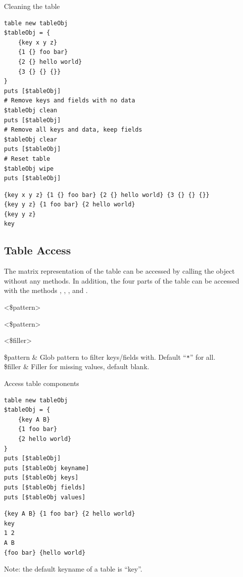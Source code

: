 \begin{example}{Cleaning the table}
\begin{lstlisting}
table new tableObj
$tableObj = {
    {key x y z}
    {1 {} foo bar}
    {2 {} hello world}
    {3 {} {} {}}
}
puts [$tableObj]
# Remove keys and fields with no data
$tableObj clean
puts [$tableObj]
# Remove all keys and data, keep fields
$tableObj clear
puts [$tableObj]
# Reset table 
$tableObj wipe
puts [$tableObj]
\end{lstlisting}
\tcblower
\begin{lstlisting}
{key x y z} {1 {} foo bar} {2 {} hello world} {3 {} {} {}}
{key y z} {1 foo bar} {2 hello world}
{key y z}
key
\end{lstlisting}
\end{example}
\clearpage

\subsection{Table Access}
The matrix representation of the table can be accessed by calling the object without any methods. 
In addition, the four parts of the table can be accessed with the methods , , , and .

\begin{syntax}
\end{syntax}
\begin{syntax}
 <\$pattern>
\end{syntax}
\begin{syntax}
 <\$pattern>
\end{syntax}
\begin{syntax}
 <\$filler>
\end{syntax}
\begin{args}
\$pattern & Glob pattern to filter keys/fields with. Default ``\texttt{*}'' for all. \\
\$filler & Filler for missing values, default blank.
\end{args}

\begin{example}{Access table components}
\begin{lstlisting}
table new tableObj
$tableObj = {
    {key A B}
    {1 foo bar}
    {2 hello world}
}
puts [$tableObj]
puts [$tableObj keyname]
puts [$tableObj keys]
puts [$tableObj fields]
puts [$tableObj values]
\end{lstlisting}
\tcblower
\begin{lstlisting}
{key A B} {1 foo bar} {2 hello world}
key
1 2
A B
{foo bar} {hello world}
\end{lstlisting}
\end{example}
Note: the default keyname of a table is ``key''.

